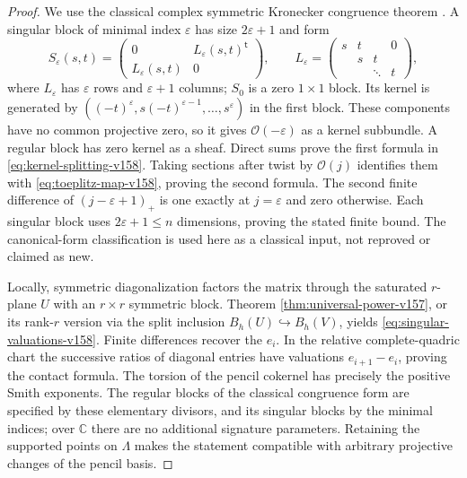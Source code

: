 \documentclass[11pt,reqno]{amsart}
\numberwithin{equation}{section}
\theoremstyle{definition}\newtheorem{definition}[theorem]{Definition}
\theoremstyle{remark}\newtheorem{remark}[theorem]{Remark}
\newcommand{\C}{\mathbb C}\newcommand{\Q}{\mathbb Q}
\newcommand{\OO}{\mathcal O}\newcommand{\II}{\mathcal I}
\begin{document}
\begin{proof}
We use the classical complex symmetric Kronecker congruence theorem
\cite{Thompson1991}. A singular block of minimal index $\varepsilon$
has size $2\varepsilon+1$ and form
\[
 S_\varepsilon(s,t)=
 \begin{pmatrix}0&L_\varepsilon(s,t)^{\mathsf t}\\
                 L_\varepsilon(s,t)&0\end{pmatrix},\qquad
 L_\varepsilon=
 \begin{pmatrix}s&t& &0\\ &s&t& \\ &&\ddots&t\end{pmatrix},
\]
where $L_\varepsilon$ has $\varepsilon$ rows and $\varepsilon+1$
columns; $S_0$ is a zero $1\times1$ block. Its kernel is generated
by $((-t)^\varepsilon,s(-t)^{\varepsilon-1},\ldots,s^\varepsilon)$
in the first block. These components have no common projective zero,
so it gives $\OO(-\varepsilon)$ as a kernel subbundle. A regular
block has zero kernel as a sheaf. Direct sums prove the first formula
in \eqref{eq:kernel-splitting-v158}. Taking sections after twist by
$\OO(j)$ identifies them with \eqref{eq:toeplitz-map-v158}, proving
the second formula. The second finite difference of
$(j-\varepsilon+1)_+$ is one exactly at $j=\varepsilon$ and zero
otherwise. Each singular block uses $2\varepsilon+1\leq n$
dimensions, proving the stated finite bound. The canonical-form
classification is used here as a classical input, not reproved or
claimed as new.

Locally, symmetric diagonalization factors the matrix through the
saturated $r$-plane $U$ with an $r\times r$ symmetric block. Theorem
\ref{thm:universal-power-v157}, or its rank-$r$ version via the split
inclusion $B_h(U)\hookrightarrow B_h(V)$, yields
\eqref{eq:singular-valuations-v158}. Finite differences recover the
$e_i$. In the relative complete-quadric chart the successive ratios
of diagonal entries have valuations $e_{i+1}-e_i$, proving the contact
formula. The torsion of the pencil cokernel has precisely the positive
Smith exponents. The regular blocks of the classical congruence form
are specified by these elementary divisors, and its singular blocks
by the minimal indices; over $\C$ there are no additional signature
parameters. Retaining the supported points on $\Lambda$ makes the
statement compatible with arbitrary projective changes of the pencil
basis.


\end{proof}
\end{document}
